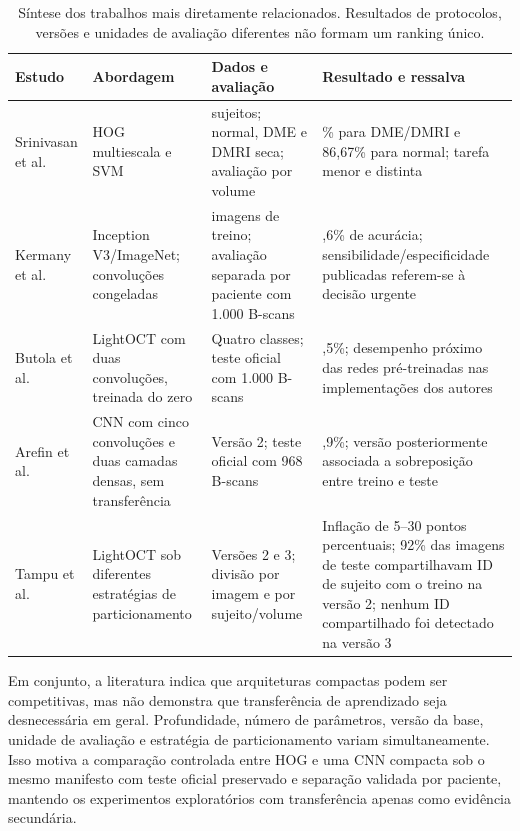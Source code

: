 \documentclass[conference]{IEEEtran}
\begin{document}
\begin{table}[t]
\caption{Síntese dos trabalhos mais diretamente relacionados. Resultados de protocolos, versões e unidades de avaliação diferentes não formam um ranking único.}
\label{tab:related-work}
\centering
\footnotesize
\setlength{\tabcolsep}{4pt}
\renewcommand{\arraystretch}{1.15}
\begin{tabular}{>{\raggedright\arraybackslash}p{}
                >{\raggedright\arraybackslash}p{}
                >{\raggedright\arraybackslash}p{}
                >{\raggedright\arraybackslash}p{}}
\toprule
\textbf{Estudo} & \textbf{Abordagem} & \textbf{Dados e avaliação} & \textbf{Resultado e ressalva} \\
\midrule
Srinivasan et al.~\cite{srinivasan2014} & HOG multiescala e SVM & 45 sujeitos; normal, DME e DMRI seca; avaliação por volume & 100\% para DME/DMRI e 86,67\% para normal; tarefa menor e distinta \\
Kermany et al.~\cite{kermany2018} & Inception V3/ImageNet; convoluções congeladas & 108.312 imagens de treino; avaliação separada por paciente com 1.000 B-scans & 96,6\% de acurácia; sensibilidade/especificidade publicadas referem-se à decisão urgente \\
Butola et al.~\cite{butola2020} & LightOCT com duas convoluções, treinada do zero & Quatro classes; teste oficial com 1.000 B-scans & 94,5\%; desempenho próximo das redes pré-treinadas nas implementações dos autores \\
Arefin et al.~\cite{arefin2021,tampu2022} & CNN com cinco convoluções e duas camadas densas, sem transferência & Versão 2; teste oficial com 968 B-scans & 97,9\%; versão posteriormente associada a sobreposição entre treino e teste \\
Tampu et al.~\cite{tampu2022} & LightOCT sob diferentes estratégias de particionamento & Versões 2 e 3; divisão por imagem e por sujeito/volume & Inflação de 5--30 pontos percentuais; 92\% das imagens de teste compartilhavam ID de sujeito com o treino na versão 2; nenhum ID compartilhado foi detectado na versão 3 \\
\bottomrule
\end{tabular}
\end{table}

Em conjunto, a literatura indica que arquiteturas compactas podem ser competitivas, mas não demonstra que transferência de aprendizado seja desnecessária em geral. Profundidade, número de parâmetros, versão da base, unidade de avaliação e estratégia de particionamento variam simultaneamente. Isso motiva a comparação controlada entre HOG e uma CNN compacta sob o mesmo manifesto com teste oficial preservado e separação validada por paciente, mantendo os experimentos exploratórios com transferência apenas como evidência secundária.
\end{document}
